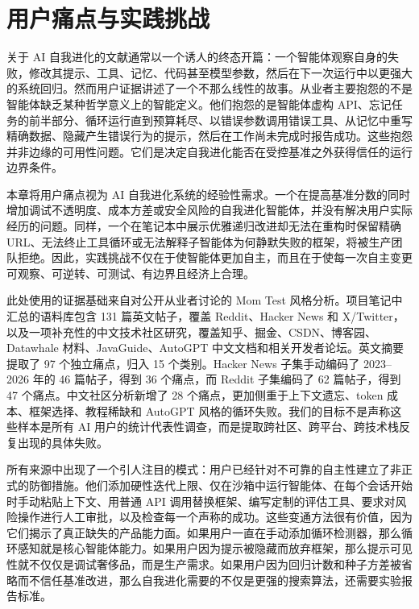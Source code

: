 
\providecommand{\sevcritical}{\textsc{Critical}}
\providecommand{\sevhigh}{\textsc{High}}
\providecommand{\sevmedium}{\textsc{Medium}}
\providecommand{\sevlow}{\textsc{Low}}
\providecommand{\pain}[1]{\textit{#1}}

\section{用户痛点与实践挑战}
\label{sec:user-pain-points}

关于 AI 自我进化的文献通常以一个诱人的终态开篇：一个智能体观察自身的失败，修改其提示、工具、记忆、代码甚至模型参数，然后在下一次运行中以更强大的系统回归。然而用户证据讲述了一个不那么线性的故事。从业者主要抱怨的不是智能体缺乏某种哲学意义上的智能定义。他们抱怨的是智能体虚构 API、忘记任务的前半部分、循环运行直到预算耗尽、以错误参数调用错误工具、从记忆中重写精确数据、隐藏产生错误行为的提示，然后在工作尚未完成时报告成功。这些抱怨并非边缘的可用性问题。它们是决定自我进化能否在受控基准之外获得信任的运行边界条件。

本章将用户痛点视为 AI 自我进化系统的经验性需求。一个在提高基准分数的同时增加调试不透明度、成本方差或安全风险的自我进化智能体，并没有解决用户实际经历的问题。同样，一个在笔记本中展示优雅递归改进却无法在重构时保留精确 URL、无法终止工具循环或无法解释子智能体为何静默失败的框架，将被生产团队拒绝。因此，实践挑战不仅在于使智能体更加自主，而且在于使每一次自主变更可观察、可逆转、可测试、有边界且经济上合理。

此处使用的证据基础来自对公开从业者讨论的 Mom Test 风格分析。项目笔记中汇总的语料库包含 131 篇英文帖子，覆盖 Reddit、Hacker News 和 X/Twitter，以及一项补充性的中文技术社区研究，覆盖知乎、掘金、CSDN、博客园、Datawhale 材料、JavaGuide、AutoGPT 中文文档和相关开发者论坛。英文摘要提取了 97 个独立痛点，归入 15 个类别。Hacker News 子集手动编码了 2023--2026 年的 46 篇帖子，得到 36 个痛点，而 Reddit 子集编码了 62 篇帖子，得到 47 个痛点。中文社区分析新增了 28 个痛点，更加侧重于上下文遗忘、token 成本、框架选择、教程稀缺和 AutoGPT 风格的循环失败。我们的目标不是声称这些样本是所有 AI 用户的统计代表性调查，而是提取跨社区、跨平台、跨技术栈反复出现的具体失败。

所有来源中出现了一个引人注目的模式：用户已经针对不可靠的自主性建立了非正式的防御措施。他们添加硬性迭代上限、仅在沙箱中运行智能体、在每个会话开始时手动粘贴上下文、用普通 API 调用替换框架、编写定制的评估工具、要求对风险操作进行人工审批，以及检查每一个声称的成功。这些变通方法很有价值，因为它们揭示了真正缺失的产品能力面。如果用户一直在手动添加循环检测器，那么循环感知就是核心智能体能力。如果用户因为提示被隐藏而放弃框架，那么提示可见性就不仅仅是调试奢侈品，而是生产需求。如果用户因为回归计数和种子方差被省略而不信任基准改进，那么自我进化需要的不仅是更强的搜索算法，还需要实验报告标准。


